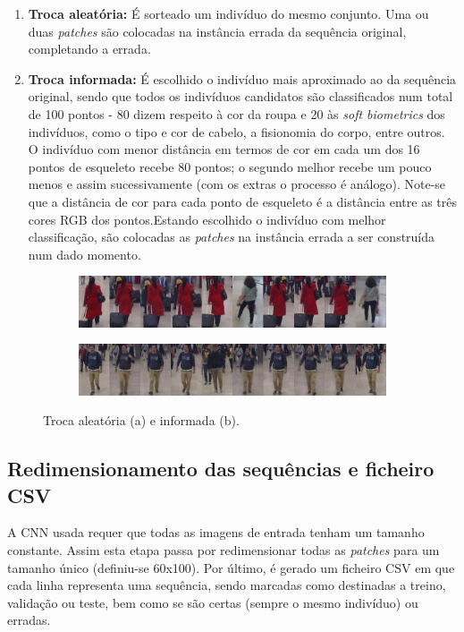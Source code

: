 \begin{enumerate}
    \item \textbf{Troca aleatória:} É sorteado um indivíduo do mesmo conjunto. Uma ou duas \textit{patches} são colocadas na instância errada da sequência original, completando a errada.
    \item \textbf{Troca informada:} É escolhido o indivíduo mais aproximado ao da sequência original, sendo que todos os indivíduos candidatos são classificados num total de 100 pontos - 80 dizem respeito à cor da roupa e 20 às \textit{soft biometrics} dos indivíduos, como o tipo e cor de cabelo, a fisionomia do corpo, entre outros. \newline \noindent O indivíduo com menor distância em termos de cor em cada um dos 16 pontos de esqueleto recebe 80 pontos; o segundo melhor recebe um pouco menos e assim sucessivamente (com os extras o processo é análogo). Note-se que a distância de cor para cada ponto de esqueleto é a distância entre as três cores RGB dos pontos.\newline \noindent Estando escolhido o indivíduo com melhor classificação, são colocadas as \textit{patches} na instância errada a ser construída num dado momento. 
\end{enumerate}{}

\begin{figure} [h]
  \centering
  \begin{subfigure}{13.5cm}
    \centering\includegraphics[width=13.5cm]{troca_aleatoria.jpg}
    \caption{}
  \end{subfigure}
  \begin{subfigure}{13.5cm}
    \centering\includegraphics[width=13.5cm]{troca_boa.jpg}
    \caption{}
  \end{subfigure}
  \caption{Troca aleatória (a) e informada (b).}
  \label{fig:trocas}
\end{figure}

\subsection{Redimensionamento das sequências e ficheiro CSV}
\label{chap3:subsec:redim}
A \ac{CNN} usada requer que todas as imagens de entrada tenham um tamanho constante. Assim esta etapa passa por redimensionar todas as \textit{patches} para um tamanho único (definiu-se 60x100).\newline
\noindent Por último, é gerado um ficheiro CSV em que cada linha representa uma sequência, sendo marcadas como destinadas a treino, validação ou teste, bem como se são certas (sempre o mesmo indivíduo) ou erradas. \newline
\noindent


